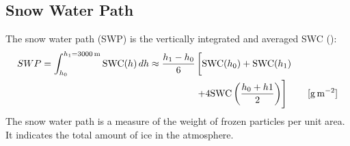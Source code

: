 \subsection{Snow Water Path}\label{sec:SWP}
The snow water path (SWP) is the vertically integrated and averaged SWC (): %
\begin{equation}
\begin{split}
SWP = \int_{h_0}^{h_1=\SI{3000}{\metre}} \text{SWC}(h) \, dh \approx 
\frac{h_1 - h_0}{6}  & \left[ \text{SWC}(h_0)    + \text{SWC}(h_1)   \vphantom{\frac{h_0 + h_1}{2}} \right. \\ 
& \left. + 4 \text{SWC}\left(\frac{h_0 + h1}{2}\right)  
\right] \qquad [\SI{}{\g\per\square\meter}]
\end{split}
\label{eq:SWP}
\end{equation}
The snow water path is a measure of the weight of frozen particles per unit area. It indicates the total amount of ice in the atmosphere.
\newpage
